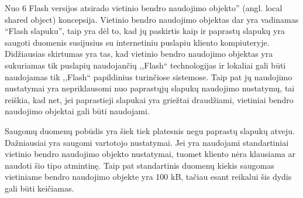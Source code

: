 \documentclass[12pt,a4paper,titlepage]{article}
\begin{document}
Nuo 6 Flash versijos atsirado vietinio bendro naudojimo objekto” (angl. local shared object)\cite{LSO11} koncepsija. Vietinio bendro naudojimo objektas dar yra vadinamas “Flash slapuku”, taip yra dėl to, kad jų paskirtis kaip ir paprastų slapukų yra saugoti duomenis susijusius su internetiniu puslapiu kliento kompiuteryje. Didžiausias skirtumas yra tas, kad vietinio bendro naudojimo objektas yra sukuriamas tik puslapių naudojančių ,,Flash`` technologijas ir lokaliai gali būti naudojamas tik ,,Flash`` papildinius turinčiose sistemose. Taip pat jų naudojimo nustatymai yra nepriklausomi nuo paprastųjų slapukų naudojimo nustatymų, tai reiškia, kad net, jei paprastieji slapukai yra griežtai draudžiami, vietiniai bendro naudojimo objektai gali būti naudojami. 

Saugomų duomenų pobūdis yra šiek tiek platesnis negu paprastų slapukų atveju. Dažniausiai yra saugomi vartotojo nustatymai. Jei yra naudojami standartiniai vietinio bendro naudojimo objekto nustatymai, tuomet kliento nėra klausiama ar naudoti šio tipo atmintinę. Taip pat standartinis duomenų kiekis saugomas vietiniame bendro naudojimo objekte yra 100 kB, tačiau esant reikalui šis dydis gali būti keičiamas. 
\end{document}
